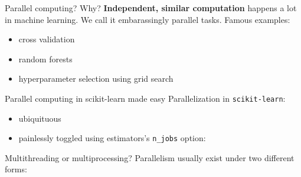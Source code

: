 \documentclass[13pt, usenames,dvipsnames]{beamer} %
\newcommand{\mycode}[2][\tiny] {\texttt{#2}}
\begin{document}
    \begin{frame}[t]{Parallel computing? Why?}
        \vspace{1cm}
        \textbf{Independent, similar computation} happens a lot in machine learning. We
        call it embarassingly parallel tasks. Famous examples:
        \vspace{1cm}
        \begin{itemize}
            \item<2-> cross validation
            \item<2-> random forests
            \item<2-> hyperparameter selection using grid search
        \end{itemize}
        \vspace{1cm}
    \end{frame}

    \begin{frame}[fragile]{Parallel computing in scikit-learn made easy}
        Parallelization in \mycode[\small]{scikit-learn}:
        \vspace{1em}
        \begin{itemize}
            \setlength\itemsep{1em}
            \item<1-> ubiquituous
            \item<1-> painlessly toggled using estimators's \mycode[\small]{n_jobs} option:
        \end{itemize}
    \end{frame}

    \begin{frame}[fragile]{Multithreading or multiprocessing?}
        Parallelism usually exist under two different forms:
        \vspace{1em}
    \end{frame}
\end{document}
